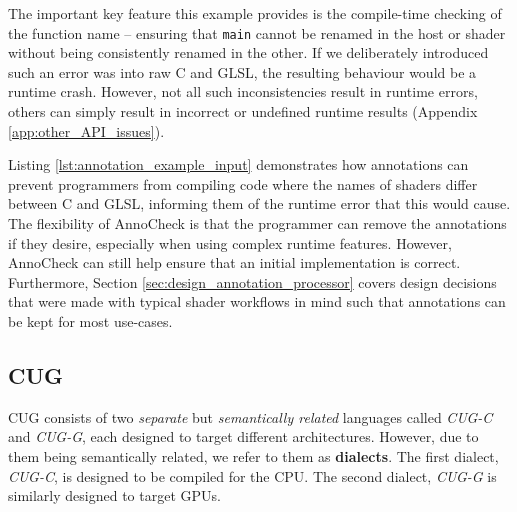 \documentclass[a4paper,12pt,twoside,openright]{report}
\begin{document}

The important key feature this example provides is the compile-time checking of
the function name -- ensuring that \texttt{main} cannot be renamed in the host
or shader without being consistently renamed in the other. If we deliberately
introduced such an error was into raw C and GLSL, the resulting behaviour would
be a runtime crash. However, not all such inconsistencies result in runtime
errors, others can simply result in incorrect or undefined runtime results
(Appendix \ref{app:other_API_issues}).

Listing \ref{lst:annotation_example_input} demonstrates how annotations can
prevent programmers from compiling code where the names of shaders differ
between C and GLSL, informing them of the runtime error that this would cause.
The flexibility of AnnoCheck is that the programmer can remove the annotations
if they desire, especially when using complex runtime features. However,
AnnoCheck can still help ensure that an initial implementation is correct.
Furthermore, Section \ref{sec:design_annotation_processor} covers design
decisions that were made with typical shader workflows in mind such that
annotations can be kept for most use-cases.

\subsection{CUG}

CUG consists of two \textit{separate} but \textit{semantically related}
languages called \textit{CUG-C} and \textit{CUG-G}, each designed to target
different architectures. However, due to them being semantically related, we
refer to them as \textbf{dialects}. The first dialect, \textit{CUG-C}, is
designed to be compiled for the CPU. The second dialect, \textit{CUG-G} is
similarly designed to target GPUs.

\end{document}
